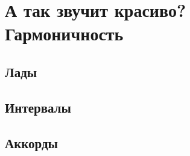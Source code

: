 \chapter{А так звучит красиво? Гармоничность}
\label{ch:harmony}

\section{Лады}
\label{ch:harmony:lad}

\section{Интервалы}
\label{ch:harmony:interval}

\section{Аккорды}
\label{ch:harmony:chords}
